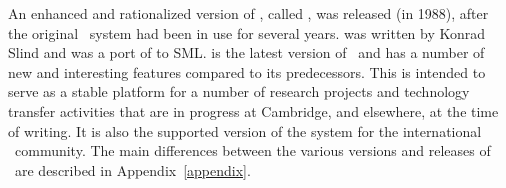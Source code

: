 An enhanced and rationalized version of \HOL, called , was
released (in 1988), after the original \HOL\ system had been in use
for several years.   was written by Konrad Slind and was a port
of  to SML.   is the latest version of \HOL\ and has a
number of new and interesting features compared to its predecessors.
This is intended to serve as a stable platform for a number of
research projects and technology transfer activities that are in
progress at Cambridge, and elsewhere, at the time of writing.  It is
also the supported version of the system for the international \HOL\
community.  The main differences between the various versions and
releases of \HOL\ are described in Appendix~\ref{appendix}.


